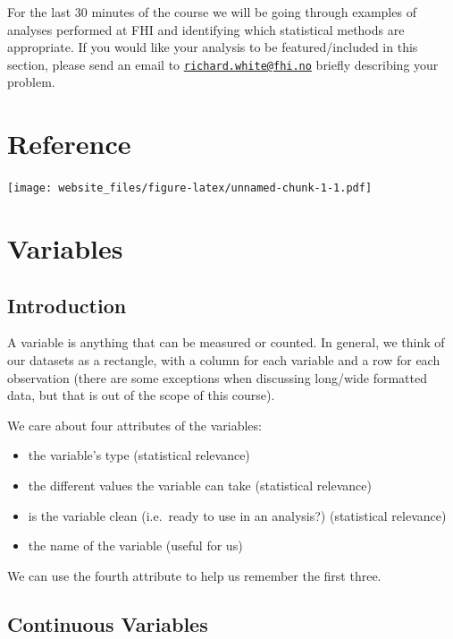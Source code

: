 \documentclass[12pt,]{article}
\providecommand{\tightlist}{%
  \setlength{\itemsep}{0pt}\setlength{\parskip}{0pt}}
\begin{document}
For the last 30 minutes of the course we will be going through examples
of analyses performed at FHI and identifying which statistical methods
are appropriate. If you would like your analysis to be featured/included
in this section, please send an email to
\href{mailto:richard.white@fhi.no}{\nolinkurl{richard.white@fhi.no}}
briefly describing your problem.

\section{Reference}\label{reference}

\texttt{[image: website\_files/figure-latex/unnamed-chunk-1-1.pdf]}

\section{Variables}\label{variables}

\subsection{Introduction}\label{introduction}

A variable is anything that can be measured or counted. In general, we
think of our datasets as a rectangle, with a column for each variable
and a row for each observation (there are some exceptions when
discussing long/wide formatted data, but that is out of the scope of
this course).

We care about four attributes of the variables:

\begin{itemize}
\tightlist
\item
  the variable's type (statistical relevance)
\item
  the different values the variable can take (statistical relevance)
\item
  is the variable clean (i.e.~ready to use in an analysis?) (statistical
  relevance)
\item
  the name of the variable (useful for us)
\end{itemize}

We can use the fourth attribute to help us remember the first three.

\subsection{Continuous Variables}\label{continuous-variables}
\end{document}
